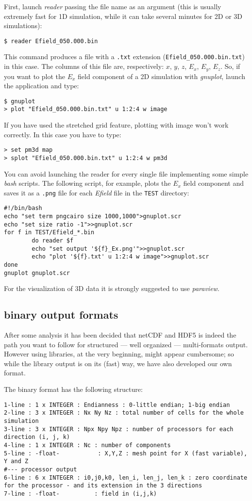 \documentclass[11pt,a4paper]{report}
\begin{document}
First, launch \emph{reader} passing the file name as an argument (this is usually extremely fast for 1D simulation, while it can take several minutes for 2D or 3D simulations):
\begin{verbatim}
$ reader Efield_050.000.bin
\end{verbatim}
This command produces a file with a \verb+.txt+ extension (\verb+Efield_050.000.bin.txt+) in this case. The columns of this file are, respectively: $x$, $y$, $z$, $E_x$, $E_y$, $E_z$. So, if you want to plot the $E_x$ field component of a 2D simulation with \emph{gnuplot}, launch the application and type:
\begin{verbatim}
$ gnuplot
> plot "Efield_050.000.bin.txt" u 1:2:4 w image
\end{verbatim}
If you have used the stretched grid feature, plotting with image won't work correctly. In this case you have to type:
\begin{verbatim}
> set pm3d map
> splot "Efield_050.000.bin.txt" u 1:2:4 w pm3d
\end{verbatim}
You can avoid launching the reader for every single file implementing some simple \emph{bash} scripts. The following script, for example, plots the
$E_x$ field component and saves it as a \verb+.png+ file for each \emph{Efield} file in the \verb+TEST+ directory:
\begin{verbatim}
#!/bin/bash
echo "set term pngcairo size 1000,1000">gnuplot.scr
echo "set size ratio -1">>gnuplot.scr
for f in TEST/Efield_*.bin
        do reader $f
        echo "set output '${f}_Ex.png'">>gnuplot.scr
        echo "plot '${f}.txt' u 1:2:4 w image">>gnuplot.scr
done
gnuplot gnuplot.scr
\end{verbatim}
For the visualization of 3D data it is strongly suggested to use \emph{paraview}.

\subsection{binary output formats}
After some analysis it has been decided that netCDF and HDF5 is indeed the path you want to follow for structured --- well organized --- multi-formats output.
However using libraries, at the very beginning, might appear cumbersome; so while the library output is on its (fast) way, we have also developed our own format.

The binary format has the following structure:
\begin{verbatim}
1-line : 1 x INTEGER : Endianness : 0-little endian; 1-big endian
2-line : 3 x INTEGER : Nx Ny Nz : total number of cells for the whole simulation
3-line : 3 x INTEGER : Npx Npy Npz : number of processors for each direction (i, j, k)
4-line : 1 x INTEGER : Nc : number of components
5-line : -float-           : X,Y,Z : mesh point for X (fast variable), Y and Z
#--- processor output
6-line : 6 x INTEGER : i0,j0,k0, len_i, len_j, len_k : zero coordinate for the processor - and its extension in the 3 directions
7-line : -float-          : field in (i,j,k)
\end{verbatim}
\end{document}
